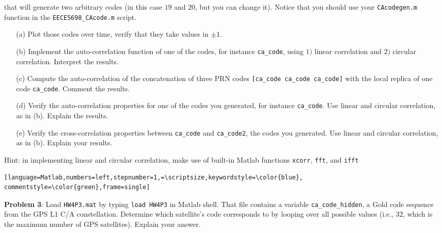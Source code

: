 \documentclass[11pt]{article}
\begin{document}
% 
% 
% 
% 
% 
% 

that will generate two arbitrary codes (in this case $19$ and $20$, but you can change it). Notice that you should use your \verb|CAcodegen.m| function in the \verb|EECE5698_CAcode.m| script. 

\begin{enumerate}
\item[(a)] Plot those codes over time, verify that they take values in $\pm1$. 
\item[(b)] Implement the auto-correlation function of one of the codes, for instance  \verb|ca_code|, using $1)$ linear correlation and $2)$ circular correlation. Interpret the results.
\item[(c)] Compute the auto-correlation of the concatenation of three PRN codes \verb|[ca_code ca_code ca_code]| with the local replica of one code \verb|ca_code|. Comment the results. 
\item[(d)] Verify the auto-correlation properties for one of the codes you generated, for instance \verb|ca_code|. Use linear and circular correlation, as in (b). Explain the results.
\item[(e)] Verify the cross-correlation properties between \verb|ca_code| and \verb|ca_code2|, the codes you generated. Use linear and circular correlation, as in (b). Explain your results.
\end{enumerate}

Hint: in implementing linear and circular correlation, make use of built-in Matlab functions \verb|xcorr|, \verb|fft|, and \verb|ifft|

\begin{lstlisting}[language=Matlab,numbers=left,stepnumber=1,=\scriptsize,keywordstyle=\color{blue}, commentstyle=\color{green},frame=single]
\end{lstlisting}
\vspace*{.5cm}

\textbf{Problem 3}:
Load \verb|HW4P3.mat| by typing \verb|load HW4P3| in Matlab shell. That file contains a variable \verb|ca_code_hidden|, a Gold code sequence from the GPS L1 C/A constellation. Determine which satellite's code corresponds to by looping over all possible values (i.e., $32$, which is the maximum number of GPS satellites). Explain your answer.
\end{document}
